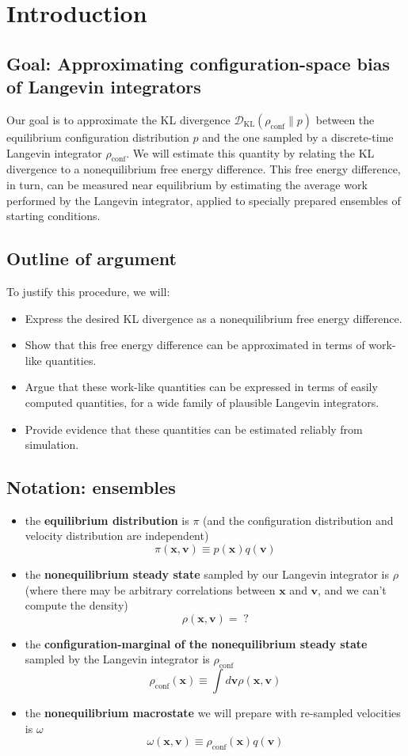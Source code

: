\documentclass[11pt]{article}
\newcommand{\x}{\mathbf{x}}
\newcommand{\vel}{\mathbf{v}}
\newcommand{\kldiv}{\mathcal{D}_\text{KL}}
\newcommand{\conf}{\rho_\text{conf}}
\begin{document}
\tableofcontents
\section{Introduction}
\subsection{Goal: Approximating configuration-space bias of Langevin integrators}
Our goal is to approximate the KL divergence $\kldiv(\conf \| p)$ between the equilibrium configuration distribution $p$ and the one sampled by a discrete-time Langevin integrator $\conf$.
We will estimate this quantity by relating the KL divergence to a nonequilibrium free energy difference. This free energy difference, in turn, can be measured near equilibrium by estimating the average work performed by the Langevin integrator, applied to specially prepared ensembles of starting conditions.
\subsection{Outline of argument}
To justify this procedure, we will:
\begin{itemize}
\item Express the desired KL divergence as a nonequilibrium free energy difference.
\item Show that this free energy difference can be approximated in terms of work-like quantities.
\item Argue that these work-like quantities can be expressed in terms of easily computed quantities, for a wide family of plausible Langevin integrators.
\item Provide evidence that these quantities can be estimated reliably from simulation.
\end{itemize}

\subsection{Notation: ensembles}
\begin{itemize}
\item the \textbf{equilibrium distribution} is $\pi$ (and the configuration distribution and velocity distribution are independent)
$$\pi(\x, \vel) \equiv p(\x) q(\vel)$$
\item the \textbf{nonequilibrium steady state} sampled by our Langevin integrator is $\rho$ (where there may be arbitrary correlations between $\x$ and $\vel$, and we can't compute the density)
$$\rho(\x, \vel) = \; ?$$
\item the \textbf{configuration-marginal of the nonequilibrium steady state} sampled by the Langevin integrator is $\conf$
$$\conf(\x) \equiv \int d\vel \rho(\x, \vel)$$
\item the \textbf{nonequilibrium macrostate} we will prepare with re-sampled velocities is $\omega$
$$\omega(\x, \vel) \equiv \conf (\x) q(\vel)$$
\end{itemize}
\end{document}
